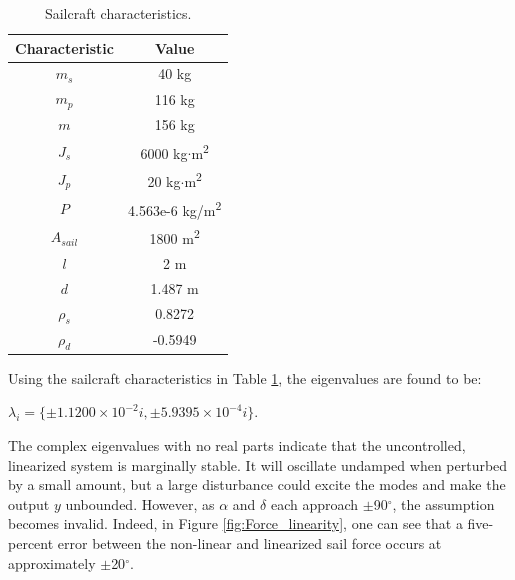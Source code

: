 \documentclass[]{aiaa-tc}%
\begin{document}
	\begin{table}[H]%
		\begin{center}
			\caption{Sailcraft characteristics.}
			\label{t:Primary_variables}
			\begin{tabular}{|c|c|}
\hline 
Characteristic & Value  \\ \hline
$m_s$         &     40 kg\\
$m_p$         &      116 kg \\
$m$         &     156 kg \\
$J_s$   &     6000 kg$\cdot$m\textsuperscript{2} \\
$J_p$   &     20 kg$\cdot$m\textsuperscript{2} \\
$P$   &      4.563e-6 kg/m\textsuperscript{2}\\
$A_{sail}$       &     1800 m\textsuperscript{2} \\
$l$       &   2 m \\
$d$       &     1.487 m \\
$\rho_s$ &     0.8272 \\
$\rho_d$ &     -0.5949 \\
\hline
			\end{tabular}
		\end{center}
	\end{table}  

	Using the sailcraft characteristics in Table \ref{t:Primary_variables}, the eigenvalues are found to be:
	
	\vspace{5 mm}
{\centering
 $\lambda_i = \{\pm1.1200\times10^{-2}i, \pm5.9395\times10^{-4}i\}$.\par
}
	
	\vspace{5 mm}

	The complex eigenvalues with no real parts indicate that the uncontrolled, linearized system is marginally stable. It will oscillate undamped when perturbed by a small amount, but a large disturbance could excite the modes and make the output $y$ unbounded. However, as $\alpha$ and $\delta$ each approach $\pm$90$^{\circ}$, the assumption becomes invalid. Indeed, in Figure \ref{fig:Force_linearity}, one can see that a five-percent error between the non-linear and linearized sail force occurs at approximately $\pm$20$^{\circ}$.

	\vspace{5 mm}
	
\end{document}
